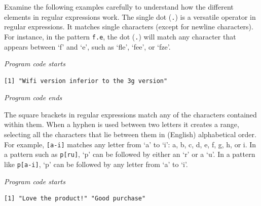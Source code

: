 Examine the following examples carefully to understand
how the different elements in regular expressions work. The single dot
(\texttt{.}) is a versatile operator in regular expressions. It matches
single characters (except for newline characters). For instance, in
the pattern \texttt{f.e}, the dot (\texttt{.}) will match any character
that appears between `f' and `e', such as `fle', `fee', or `fze'.

\emph{Program code starts}

\begin{Shaded}
\begin{Highlighting}[]
\NormalTok{(} \NormalTok{)}
\end{Highlighting}
\end{Shaded}

\begin{verbatim}
[1] "Wifi version inferior to the 3g version"
\end{verbatim}

\emph{Program code ends}

The square brackets in regular expressions match any of the characters contained within them. When a hyphen is used between two letters it creates a
range, selecting all the characters that lie between them in (English) alphabetical
order. For example, \texttt{{[}a-i{]}} matches any letter from `a' to
`i': a, b, c, d, e, f, g, h, or i. In a pattern such as
\texttt{p{[}ru{]}}, `p' can be followed by either an `r' or a `u'. In a
pattern like \texttt{p{[}a-i{]}}, `p' can be followed by any letter from
`a' to `i'.

\emph{Program code starts}

\begin{Shaded}
\begin{Highlighting}[]
\NormalTok{(} \NormalTok{)}
\end{Highlighting}
\end{Shaded}

\begin{verbatim}
[1] "Love the product!" "Good purchase"    
\end{verbatim}

